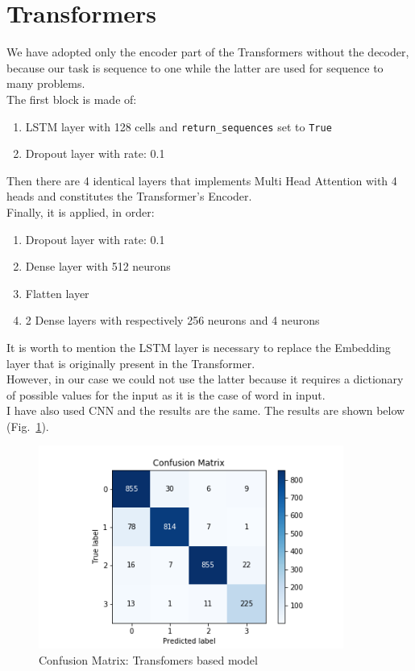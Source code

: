 \documentclass[LaM,binding=0.6cm]{sapthesis}
\begin{document}
\section{Transformers}
We have adopted only the encoder part of the Transformers without the decoder, because our task is sequence to one while the latter are used for sequence to many problems.\\The first block is made of:
\begin{enumerate}
\item LSTM layer with 128 cells and \texttt{return\_sequences} set to \texttt{True}
\item Dropout layer with rate: 0.1
\end{enumerate}
Then there are 4 identical layers that implements Multi Head Attention with 4 heads and constitutes the Transformer's Encoder.\\Finally, it is applied, in order:
\begin{enumerate}
\item Dropout layer with rate: 0.1
\item Dense layer with 512 neurons
\item Flatten layer
\item 2 Dense layers with respectively 256 neurons and 4 neurons
\end{enumerate}
It is worth to mention the LSTM layer is necessary to replace the Embedding layer that is originally present in the Transformer.\\However, in our case we could not use the latter because it requires a dictionary of possible values for the input as it is the case of word in input.\\I have also used CNN and the results are the same.
The results are shown below (Fig.~\ref{fig:transf}).
\begin{figure}[H]  \centering
	\includegraphics[width=100mm,scale=0.7]{transf}
	\caption{Confusion Matrix: Transfomers based model }
	\label{fig:transf}
\end{figure}
\end{document}
